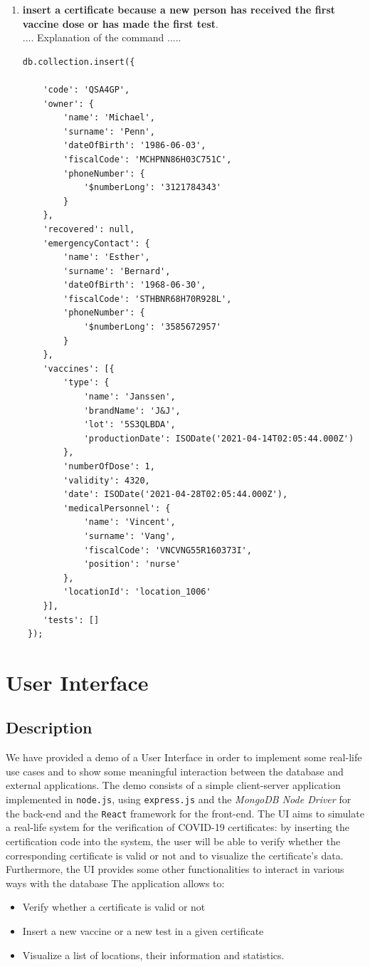 \documentclass{article}
\begin{document}
\begin{enumerate}
\begin{lstlisting}
        });
    \end{lstlisting}
    \item \textbf{insert a certificate because a new person has received the first vaccine dose or has made the first test}.\\ .... Explanation of the command .....
    \begin{lstlisting}
db.collection.insert({
    
    'code': 'QSA4GP',
    'owner': {
        'name': 'Michael',
        'surname': 'Penn',
        'dateOfBirth': '1986-06-03',
        'fiscalCode': 'MCHPNN86H03C751C',
        'phoneNumber': {
            '$numberLong': '3121784343'
        }
    },
    'recovered': null,
    'emergencyContact': {
        'name': 'Esther',
        'surname': 'Bernard',
        'dateOfBirth': '1968-06-30',
        'fiscalCode': 'STHBNR68H70R928L',
        'phoneNumber': {
            '$numberLong': '3585672957'
        }
    },
    'vaccines': [{
        'type': {
            'name': 'Janssen',
            'brandName': 'J&J',
            'lot': '5S3QLBDA',
            'productionDate': ISODate('2021-04-14T02:05:44.000Z')
        },
        'numberOfDose': 1,
        'validity': 4320,
        'date': ISODate('2021-04-28T02:05:44.000Z'),
        'medicalPersonnel': {
            'name': 'Vincent',
            'surname': 'Vang',
            'fiscalCode': 'VNCVNG55R160373I',
            'position': 'nurse'
        },
        'locationId': 'location_1006'
    }],
    'tests': []
 });
    \end{lstlisting}
\end{enumerate}
\section{User Interface}
    \subsection{Description}
    We have provided a demo of a User Interface in order to implement some real-life use cases and to show some meaningful interaction between the database and external applications. The demo consists of a simple client-server application implemented in \verb|node.js|, using \verb|express.js| and the \textit{MongoDB Node Driver} for the back-end and the \verb|React| framework for the front-end.
    The UI aims to simulate a real-life system for the verification of COVID-19 certificates: by inserting the certification code into the system, the user will be able to verify whether the corresponding certificate is valid or not and to visualize the certificate's data. Furthermore, the UI provides some other functionalities to interact in various ways with the database
    The application allows to:
    \begin{itemize}
    \item Verify whether a certificate is valid or not
    \item Insert a new vaccine or a new test in a given certificate
    \item Visualize a list of locations, their information and statistics.
    \end{itemize}
\end{document}

